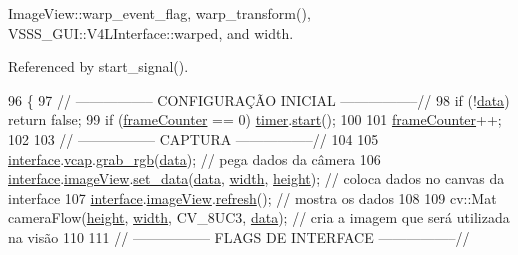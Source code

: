 Image\+View\+::warp\+\_\+event\+\_\+flag, warp\+\_\+transform(), V\+S\+S\+S\+\_\+\+G\+U\+I\+::\+V4\+L\+Interface\+::warped, and width.



Referenced by start\+\_\+signal().


\begin{DoxyCode}
96                               \{
97     \textcolor{comment}{// ----------------- CONFIGURAÇÃO INICIAL -----------------//}
98     \textcolor{keywordflow}{if} (!\hyperlink{class_cam_cap_a516da4047c872d26767e50fb09799400}{data}) \textcolor{keywordflow}{return} \textcolor{keyword}{false};
99     \textcolor{keywordflow}{if} (\hyperlink{class_cam_cap_a8a9611d808c20c937eb8a543bdf00cee}{frameCounter} == 0) \hyperlink{class_cam_cap_a2ea4ba1566017370f13057ec3d8b43ff}{timer}.\hyperlink{class_c_p_u_timer_a8712b4f64c79a210e91bbb72ed55bfc1}{start}();
100 
101     \hyperlink{class_cam_cap_a8a9611d808c20c937eb8a543bdf00cee}{frameCounter}++;
102 
103     \textcolor{comment}{// ----------------- CAPTURA -----------------//}
104 
105     \hyperlink{class_cam_cap_a58002893dfb61307042ddbba0c362dcd}{interface}.\hyperlink{class_v_s_s_s___g_u_i_1_1_v4_l_interface_a7ece61f4ccc6d5321c445e60f34e7f33}{vcap}.\hyperlink{classv4lcap_a4ef7f2a17a32f5b89bf9ddce123a3b52}{grab\_rgb}(\hyperlink{class_cam_cap_a516da4047c872d26767e50fb09799400}{data}); \textcolor{comment}{// pega dados da câmera}
106     \hyperlink{class_cam_cap_a58002893dfb61307042ddbba0c362dcd}{interface}.\hyperlink{class_v_s_s_s___g_u_i_1_1_v4_l_interface_a2c99f4d9fad8a34fa98d5b61beb06745}{imageView}.\hyperlink{class_image_view_a34baa17952c6cbc4374f1bb6bdbbd757}{set\_data}(\hyperlink{class_cam_cap_a516da4047c872d26767e50fb09799400}{data}, \hyperlink{class_cam_cap_ac22698ba7ba278ffd8f7af7bd86a62c9}{width}, 
      \hyperlink{class_cam_cap_ab2c69bebfede0ba522b982b5f47b384e}{height}); \textcolor{comment}{// coloca dados no canvas da interface}
107     \hyperlink{class_cam_cap_a58002893dfb61307042ddbba0c362dcd}{interface}.\hyperlink{class_v_s_s_s___g_u_i_1_1_v4_l_interface_a2c99f4d9fad8a34fa98d5b61beb06745}{imageView}.\hyperlink{class_image_view_a1c14fbed1a32a6f159c9916b6bd04d0a}{refresh}(); \textcolor{comment}{// mostra os dados}
108 
109     cv::Mat cameraFlow(\hyperlink{class_cam_cap_ab2c69bebfede0ba522b982b5f47b384e}{height}, \hyperlink{class_cam_cap_ac22698ba7ba278ffd8f7af7bd86a62c9}{width}, CV\_8UC3, \hyperlink{class_cam_cap_a516da4047c872d26767e50fb09799400}{data}); \textcolor{comment}{// cria a imagem que será utilizada na
       visão}
110 
111     \textcolor{comment}{// ----------------- FLAGS DE INTERFACE -----------------//}

\end{DoxyCode}
